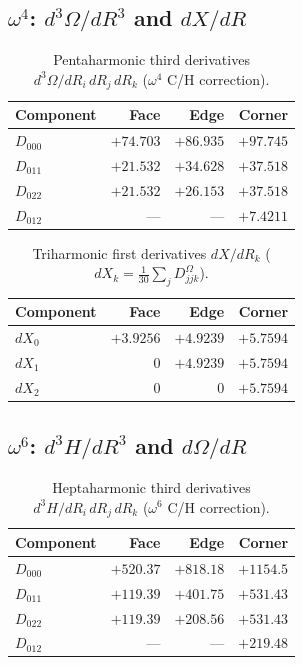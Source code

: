 \documentclass[11pt,a4paper]{article}
\theoremstyle{plain}
\theoremstyle{remark}
\begin{document}
\subsection{$\omega^4$: $d^3\Omega/dR^3$ and $dX/dR$}

\begin{table}[ht]
\centering
\caption{Pentaharmonic third derivatives $d^3\Omega/dR_i\,dR_j\,dR_k$ ($\omega^4$ C/H correction).}
\label{tab:d3omega}
\begin{tabular}{l*{3}{r}}
\toprule
Component & Face & Edge & Corner \\
\midrule
$D_{000}$ & $+74.703$ & $+86.935$ & $+97.745$ \\
$D_{011}$ & $+21.532$ & $+34.628$ & $+37.518$ \\
$D_{022}$ & $+21.532$ & $+26.153$ & $+37.518$ \\
$D_{012}$ & --- & --- & $+7.4211$ \\
\bottomrule
\end{tabular}
\end{table}

\begin{table}[ht]
\centering
\caption{Triharmonic first derivatives $dX/dR_k$
($dX_k = \tfrac{1}{30}\sum_j D^\Omega_{jjk}$).}
\label{tab:dX}
\begin{tabular}{l*{3}{r}}
\toprule
Component & Face & Edge & Corner \\
\midrule
$dX_0$ & $+3.9256$ & $+4.9239$ & $+5.7594$ \\
$dX_1$ & $0$ & $+4.9239$ & $+5.7594$ \\
$dX_2$ & $0$ & $0$ & $+5.7594$ \\
\bottomrule
\end{tabular}
\end{table}

\subsection{$\omega^6$: $d^3 H/dR^3$ and $d\Omega/dR$}

\begin{table}[ht]
\centering
\caption{Heptaharmonic third derivatives $d^3 H/dR_i\,dR_j\,dR_k$ ($\omega^6$ C/H correction).}
\label{tab:d3H}
\begin{tabular}{l*{3}{r}}
\toprule
Component & Face & Edge & Corner \\
\midrule
$D_{000}$ & $+520.37$ & $+818.18$ & $+1154.5$ \\
$D_{011}$ & $+119.39$ & $+401.75$ & $+531.43$ \\
$D_{022}$ & $+119.39$ & $+208.56$ & $+531.43$ \\
$D_{012}$ & --- & --- & $+219.48$ \\
\bottomrule
\end{tabular}
\end{table}
\end{document}
